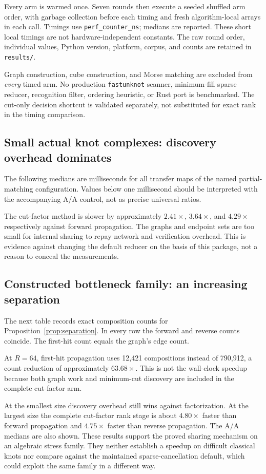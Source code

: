 \documentclass[11pt,letterpaper]{article}
\theoremstyle{definition}\newtheorem{definition}[theorem]{Definition}
\theoremstyle{remark}\newtheorem{remark}[theorem]{Remark}
\newcommand{\code}[1]{\texttt{#1}}
\begin{document}
Every arm is warmed once. Seven rounds then execute a seeded shuffled arm
order, with garbage collection before each timing and fresh algorithm-local
arrays in each call. Timings use \code{perf\_counter\_ns}; medians are
reported. These short local timings are not hardware-independent constants.
The raw round order, individual values, Python version, platform, corpus,
and counts are retained in \code{results/}.

Graph construction, cube construction, and Morse matching are excluded from
\emph{every} timed arm. No production \code{fastunknot} scanner, minimum-fill
sparse reducer, recognition filter, ordering heuristic, or Rust port is
benchmarked. The cut-only decision shortcut is validated separately, not
substituted for exact rank in the timing comparison.

\subsection{Small actual knot complexes: discovery overhead dominates}
The following medians are milliseconds for all transfer maps of the named
partial-matching configuration. Values below one millisecond should be
interpreted with the accompanying A/A control, not as precise universal
ratios.

The cut-factor method is slower by approximately $2.41\times$, $3.64\times$,
and $4.29\times$ respectively against forward propagation. The graphs and
endpoint sets are too small for internal sharing to repay network and
verification overhead. This is evidence against changing the default
reducer on the basis of this package, not a reason to conceal the measurements.

\subsection{Constructed bottleneck family: an increasing separation}
The next table records exact composition counts for
Proposition~\ref{prop:separation}. In every row the forward and reverse
counts coincide. The first-hit count equals the graph's edge count.

At $R=64$, first-hit propagation uses 12,421 compositions instead of
790,912, a count reduction of approximately $63.68\times$. This is not the
wall-clock speedup because both graph work and minimum-cut discovery are
included in the complete cut-factor arm.

At the smallest size discovery overhead still wins against factorization.
At the largest size the complete cut-factor rank stage is about
$4.80\times$ faster than forward propagation and $4.75\times$ faster than
reverse propagation. The A/A medians are also shown. These results support
the proved sharing mechanism on an algebraic stress family. They neither
establish a speedup on difficult classical knots nor compare against the
maintained sparse-cancellation default, which could exploit the same family
in a different way.
\end{document}
